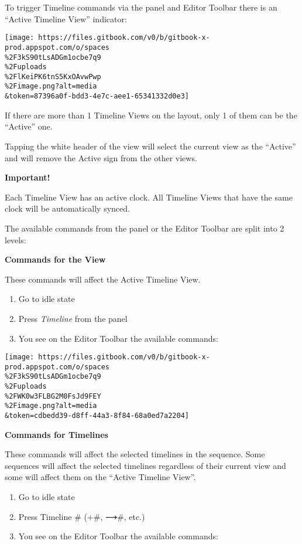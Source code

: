 \documentclass[
]{article}
\begin{document}
To trigger Timeline commands via the panel and Editor Toolbar there is an ``Active Timeline View'' indicator:

\texttt{[image: https://files.gitbook.com/v0/b/gitbook-x-prod.appspot.com/o/spaces\\\%2F3kS90tLsADGm1ocbe7q9\\\%2Fuploads\\\%2FlKeiPK6tnS5KxOAvwPwp\\\%2Fimage.png?alt=media\\\&token=87396a0f-bdd3-4e7c-aee1-65341332d0e3]}

If there are more than 1 Timeline Views on the layout, only 1 of them can be the ``Active'' one.

Tapping the white header of the view will select the current view as the ``Active'' and will remove the Active sign from the other views.

{\textbf{Important!}}

Each Timeline View has an active clock. All Timeline Views that have the same clock will be automatically synced.

The available commands from the panel or the Editor Toolbar are split into 2 levels:

\textbf{Commands for the View}

These commands will affect the Active Timeline View.

\begin{enumerate}
\def\labelenumi{\arabic{enumi}.}
\item
  Go to idle state
\item
  Press \emph{Timeline} from the panel
\item
  You see on the Editor Toolbar the available commands:
\end{enumerate}

\texttt{[image: https://files.gitbook.com/v0/b/gitbook-x-prod.appspot.com/o/spaces\\\%2F3kS90tLsADGm1ocbe7q9\\\%2Fuploads\\\%2FWK0w3FLBG2M0FsJd9FEY\\\%2Fimage.png?alt=media\\\&token=cdbedd39-d8ff-44a3-8f84-68a0ed7a2204]}

\textbf{Commands for Timelines}

These commands will affect the selected timelines in the sequence. Some sequences will affect the selected timelines regardless of their current view and some will affect them on the ``Active Timeline View''.

\begin{enumerate}
\def\labelenumi{\arabic{enumi}.}
\item
  Go to idle state
\item
  Press Timeline \# (+\#, ⟶\#, etc.)
\item
  You see on the Editor Toolbar the available commands:
\end{enumerate}
\end{document}
